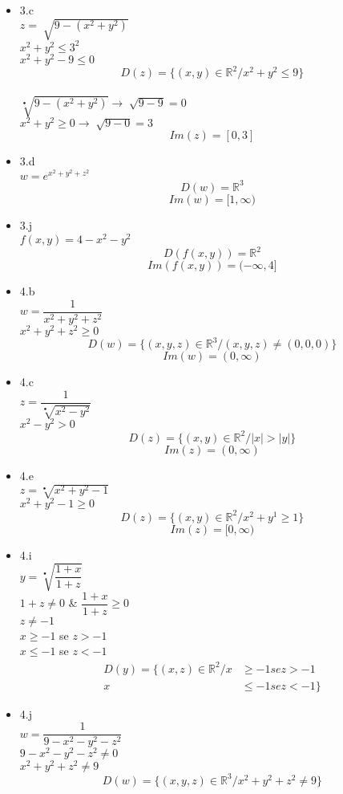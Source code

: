 \documentclass{article}
\begin{document}
\begin{itemize}
		\item 3.c \\$z=\sqrt[ ]{9-(x^2+y^2)}$
		\\$x^2+y^2\leq 3^2$
		\\$x^2+y^2-9 \leq 0$
		$$D(z)=\{(x,y) \in \mathbb{R}^2 / x^2+y^2 \leq 9\}$$
		\\$\sqrt[•]{9-(x^2+y^2)} \to \sqrt[]{9-9}= 0$
		\\$x^2+y^2 \geq 0 \to \sqrt[]{9-0} = 3$
		$$Im(z) = [0,3]$$
		\item 3.d
		\\$w = e^{x^2+y^2+z^2}$
		$$D(w) = \mathbb{R}^3 $$		
		$$Im(w) = [1, \infty)$$
		\item 3.j
		\\$f(x,y) = 4-x^2-y^2$
		$$D(f(x,y)) = \mathbb{R}^2$$
		$$Im(f(x,y)) = (-\infty,4]$$
		\item 4.b
		\\$w = \dfrac{1}{x^2+y^2+z^2}$
		\\$x^2+y^2+z^2 \geq 0$
		$$D(w) = \{(x,y,z) \in \mathbb{R}^3 / (x,y,z) \neq (0,0,0)\}$$
		$$Im(w) = (0, \infty)$$
		\item 4.c 
		\\$z=\dfrac{1}{\sqrt[•]{x^2-y^2}}$
		\\$x^2-y^2 > 0$
		$$D(z) = \{(x,y) \in \mathbb{R}^2 / |x|>|y|\}$$
		$$Im(z) = (0,\infty)$$
		\item 4.e
		\\$z=\sqrt[•]{x^2+y^2-1}$
		\\$x^2+y^2-1 \geq 0$
		$$D(z) = \{(x,y) \in \mathbb{R}^2 / x^2+y^1 \geq 1\}$$
		$$Im(z) = [0,\infty)$$
		\item 4.i 
		\\$y = \sqrt[•]{\dfrac{1+x}{1+z}}$
		\\$1+z \neq 0$ \& $\dfrac{1+x}{1+z}\geq 0$
		\\$z\neq-1$
		\\$x \geq -1$ se $z > -1$
		\\$x \leq -1$ se $z < -1$
		\begin{align*}
		D(y) = \{(x,z) \in \mathbb{R}^2 /  x &\geq -1 se z>-1\\
		x&\leq -1 se z<-1\}
		\end{align*}
		\item 4.j
		\\$w = \dfrac{1}{9-x^2-y^2-z^2}$
		\\$9-x^2-y^2-z^2 \neq 0$
		\\$x^2+y^2+z^2 \neq 9$
		$$D(w) = \{(x,y,z) \in \mathbb{R}^3 / x^2+y^2+z^2 \neq 9\}$$		

\end{itemize}
\end{document}
